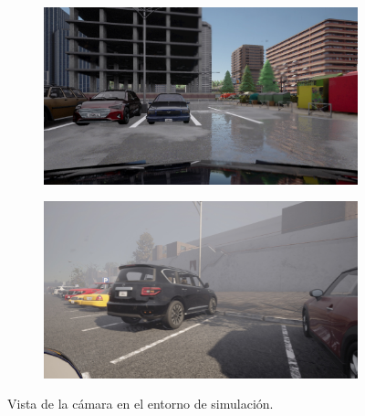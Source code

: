 \begin{figure}[!ht]
    \centering
    \begin{subfigure}{0.4\textwidth}
        \includegraphics[width=\textwidth]{img/mirrow_camara_ex}\label {fig:camara}
    \end{subfigure}
    \begin{subfigure}{0.4\textwidth}
        \includegraphics[width=\textwidth]{img/mirrow_camara_ex2}\label {fig:camara2}
    \end{subfigure}
    \caption{Vista de la cámara en el entorno de simulación.}
    \label{fig:camera-view}
\end{figure}




